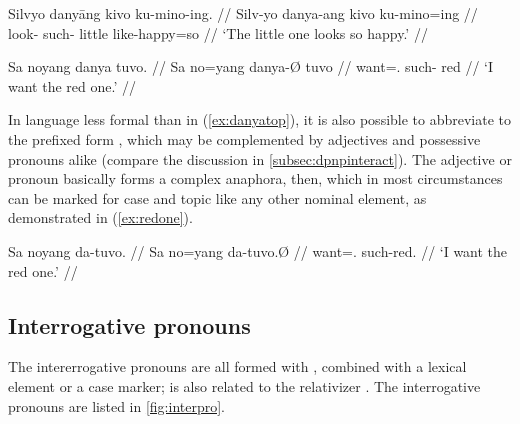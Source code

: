 \pex
\a\begingl
	\gla Silvyo danyāng kivo ku-mino-ing. //
	\glb Silv-yo danya-ang kivo ku-mino=ing //
	\glc look-\TsgN{} such-\Aarg{} little like-happy=so //
	\glft `The little one looks so happy.' //
\endgl

\a\label{ex:danyatop}\begingl
	\gla Sa noyang danya tuvo. //
	\glb Sa no=yang danya-Ø tuvo //
	\glc \PatT{} want=\Fsg{}.\Aarg{} such-\Top{} red //
	\glft `I want the red one.' //
\endgl

\xe


In language less formal than in (\ref{ex:danyatop}), it is also possible to 
abbreviate  to the prefixed form , which may be 
complemented by adjectives and possessive pronouns alike (compare the 
discussion in \autoref{subsec:dpnpinteract}). The adjective or pronoun 
basically forms a complex anaphora, then, which in most circumstances can be 
marked for case and topic like any other nominal element, as demonstrated in 
(\ref{ex:redone}).

\ex\label{ex:redone}\begingl
	\gla Sa noyang da-tuvo. //
	\glb Sa no=yang da-tuvo.Ø //
	\glc \PatT{} want=\Fsg{}.\Aarg{} such-red.\Top{} //
	\glft `I want the red one.' //
\endgl\xe


\subsection{Interrogative pronouns}
\label{subsec:interpro}

The intererrogative pronouns are all formed with , combined with 
a lexical element or a case marker;  is also related to the 
relativizer . The interrogative pronouns are listed in 
\autoref{fig:interpro}.


